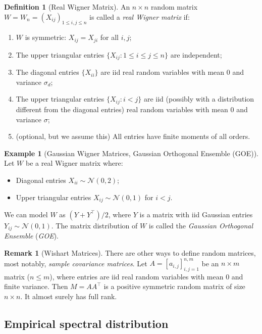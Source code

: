 \documentclass[letterpaper,11pt,oneside,reqno]{article}
\numberwithin{equation}{section}
\theoremstyle{definition}
\newtheorem{definition}[proposition]{Definition}
\newtheorem{remark}[proposition]{Remark}
\newtheorem{example}[proposition]{Example}
\begin{document}
\begin{definition}[Real Wigner Matrix]
An $n \times n$ random matrix $W=W_n = (X_{ij})_{1 \leq i,j \leq n}$ is called a \emph{real Wigner matrix} if:
\begin{enumerate}
    \item $W$ is symmetric: $X_{ij} = X_{ji}$ for all $i,j$;
    \item The upper triangular entries $\{X_{ij}: 1 \leq i \leq j \leq n\}$ are independent;
    \item The diagonal entries $\{X_{ii}\}$ are iid real random variables with mean $0$ and variance $\sigma_d$;
    \item The upper triangular entries $\{X_{ij}: i < j\}$ are iid
			(possibly with a distribution different from the diagonal entries) real random variables
			with mean $0$ and variance $\sigma$;
		\item (optional, but we assume this) All entries have finite moments of all orders.
\end{enumerate}
\end{definition}

\begin{example}[Gaussian Wigner Matrices, Gaussian Orthogonal Ensemble (GOE)]
Let $W$ be a real Wigner matrix where:
\begin{itemize}
    \item Diagonal entries $X_{ii} \sim \mathcal{N}(0, 2)$;
		\item Upper triangular entries $X_{ij} \sim \mathcal{N}(0, 1)$ for $i < j$.
\end{itemize}
We can model $W$ as $(Y+Y^\top)/2$,
where $Y$ is a matrix with iid Gaussian entries $Y_{ij} \sim \mathcal{N}(0, 1)$.
The matrix distribution of $W$ is called
the \emph{Gaussian Orthogonal Ensemble} (\emph{GOE}).
\end{example}

\begin{remark}[Wishart Matrices]
	\label{rmk:wishart-matrices}
	There are other ways to define random matrices,
	most notably, \emph{sample covariance matrices}.
	Let $A = [a_{i,j}]_{i,j=1}^{n,m}$ be an $n \times m$ matrix ($n \leq m$), where entries are iid real random variables with
	mean $0$ and finite variance.
	Then $M = AA^\top$ is a positive symmetric random matrix of
	size $n \times n$. It almost surely has full rank.
\end{remark}


\subsection{Empirical spectral distribution}
\end{document}
